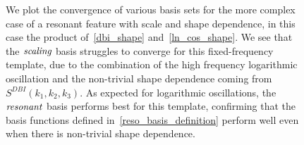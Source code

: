 \begin{figure}[!pth]
\centering     %
\caption{
    We plot the convergence of various basis sets for the more complex case of a resonant
    feature with scale and shape dependence, in this case the product of~\eqref{dbi_shape}
    and~\eqref{ln_cos_shape}.
    We see that the $\textit{scaling}$ basis struggles to converge for this fixed-frequency
    template, due to the combination of the high frequency logarithmic oscillation
    and the non-trivial shape dependence coming from $S^{DBI}(k_1,k_2,k_3)$.
    As expected for logarithmic oscillations,
    the $\textit{resonant}$ basis performs best for this template, confirming that
    the basis functions defined in~\eqref{reso_basis_definition} perform well
    even when there is non-trivial shape dependence.
}\label{fig:log_recon_osc_dbiosc}
\end{figure}

